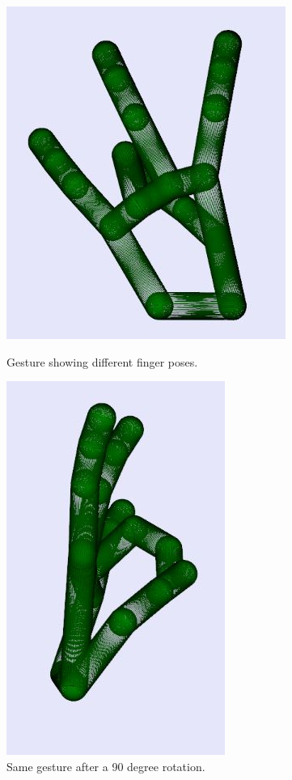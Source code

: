 \begin{figure}[H]
    \centering
    \begin{minipage}{0.45\textwidth}
        \centering
        \includegraphics[scale=.5]{Figures/straight_curved_thumb1.JPG} %
        \caption{Gesture showing different finger poses.}
		\label{fig:gestureComponents1}
    \end{minipage}\hfill
    \begin{minipage}{0.45\textwidth}
        \centering
        \includegraphics[scale=.5]{Figures/straight_curved_thumb2.JPG} %
        \caption{Same gesture after a 90 degree rotation.}
        \label{fig:gestureComponents2}
    \end{minipage}
\end{figure}


